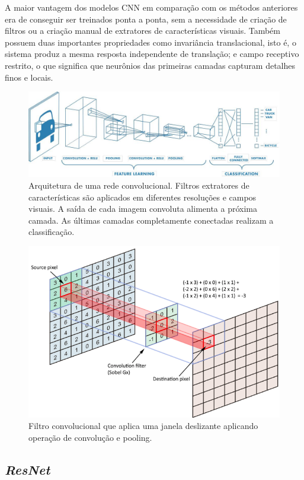 A maior vantagem dos modelos CNN em comparação com os métodos anteriores era de conseguir ser treinados ponta a ponta, sem a necessidade de criação de filtros ou a criação manual de extratores de características visuais. Também possuem duas importantes propriedades como invariância translacional, isto é, o sistema produz a mesma resposta independente de translação; e campo receptivo restrito, o que significa que neurônios das primeiras camadas capturam detalhes finos e locais.
\begin{figure}[!ht]
    \centering
    \includegraphics[width=0.95\columnwidth]{
        Imagens/CNN_mathworks.jpg
    }
    \caption{Arquitetura de uma rede convolucional. Filtros extratores de características são aplicados em diferentes resoluções e campos visuais. A saída de cada imagem convoluta alimenta a próxima camada. As últimas camadas completamente conectadas realizam a classificação.}
    \label{fig:cnn}
\end{figure}

\begin{figure}[!ht]
    \centering
    \includegraphics[width=0.6\columnwidth]{
        Imagens/operacao_conv.png
    }
    \caption{
 Filtro convolucional que aplica uma janela deslizante aplicando operação de convolução e pooling.  
    }
    \label{fig:conv}
\end{figure}

\subsection{\textit{ResNet}}\label{sec:Cap2_ResNet}

